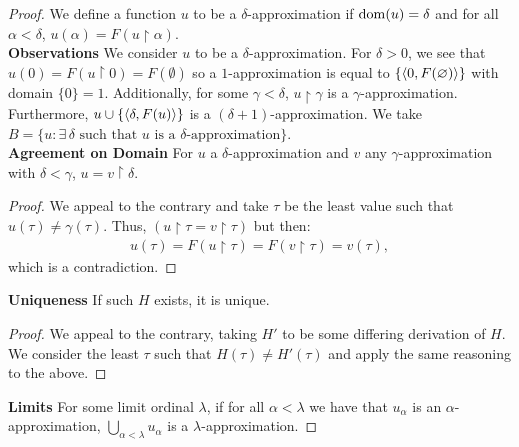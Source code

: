 \begin{proof}
    We define a function $u$ to be a $\delta$-approximation if 
    $\operatorname{dom}(u) = \delta$ and for all $\alpha < \delta$, 
    $u(\alpha) = F(u \upharpoonright \alpha)$. 
    \\[\baselineskip]
    \textbf{Observations} \newline
    We consider $u$ to be a $\delta$-approximation.
    For $\delta > 0$, we see that $u(0) = F(u \upharpoonright 0) = F(\emptyset)$
    so a $1$-approximation is equal to $\{\langle 0, F(\varnothing) \rangle\}$
    with domain $\{0\} = 1$. Additionally, for some $\gamma < \delta$, 
    $u \upharpoonright \gamma$ is a $\gamma$-approximation.
    Furthermore, $u \cup \{\langle \delta, F(u) \rangle\}$ is a 
    $(\delta + 1)$-approximation. We take $B = \{u : \exists \, \delta
    \text{ such that } u \text{ is a $\delta$-approximation}\}$.
    \\[\baselineskip]
    \textbf{Agreement on Domain} \newline
    For $u$ a $\delta$-approximation and $v$ any $\gamma$-approximation
    with $\delta < \gamma$, $u = v \upharpoonright \delta$.
    \begin{proof}
        We appeal to the contrary and take $\tau$ be the least value such that
        \linebreak $u(\tau) \neq \gamma(\tau)$. Thus, $(u \upharpoonright \tau
        = v \upharpoonright \tau)$ but then: \begin{align*}
            u(\tau) 
            = F(u \upharpoonright \tau)
            = F(v \upharpoonright \tau)
            = v(\tau),
        \end{align*} which is a contradiction.
    \end{proof}
    \vspace{3mm}\noindent
    \textbf{Uniqueness} \newline
    If such $H$ exists, it is unique.
    \begin{proof}
        We appeal to the contrary, taking $H'$ to be some differing
        derivation of $H$. We consider the least $\tau$ such that
        $H(\tau) \neq H'(\tau)$ and apply the same reasoning
        to the above.
    \end{proof}
    \vspace{3mm}\noindent
    \textbf{Limits} \newline
    For some limit ordinal $\lambda$, if for all $\alpha < \lambda$
    we have that $u_\alpha$ is an $\alpha$-approximation, 
    $\bigcup_{\alpha < \lambda} u_\alpha$ is a $\lambda$-approximation.

\end{proof}
